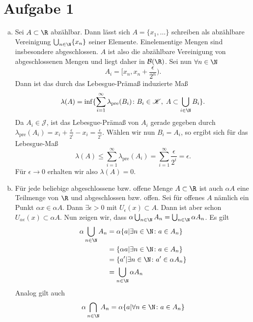 \documentclass{article}
\begin{document}
\def\headheight{25pt}
    \section*{Aufgabe 1}    
    \begin{enumerate}[(a)]
        \item Sei $A \subset \R$ abzählbar. Dann lässt sich $A = \{x_1, \dots \}$ schreiben als abzählbare Vereinigung $\bigcup_{n\in \N} \{x_n\}$ seiner Elemente. Einelementige Mengen sind insbesondere abgeschlossen. $A$ ist also die abzählbare Vereinigung von abgeschlossenen Mengen und liegt daher in $\mathcal{B}(\R)$. Sei nun $\forall n \in \N$
        \[
            A_i = [x_n, x_n + \frac{\epsilon}{2^n}).
        \]
        Dann ist das durch das Lebesgue-Prämaß induzierte Maß
        \[
            \lambda(A) = \inf \{\sum_{i = 1}^{\infty} \lambda_{\text{pre}}(B_i)\colon B_i \in \mathscr{K},\; A \subset \bigcup_{i\in \N} B_i\}.
        \]
        Da $A_i \in \mathscr{J}$, ist das Lebesgue-Prämaß von $A_i$ gerade gegeben durch $\lambda_\text{pre}(A_i) = x_i + \frac{\epsilon}{2^i} - x_i = \frac{\epsilon}{2^i}$. Wählen wir nun $B_i = A_i$, so ergibt sich für das Lebesgue-Maß
        \[
        \lambda(A) \leq \sum_{i = 1}^{\infty} \lambda_\text{pre}(A_i) = \sum_{i = 1}^{\infty} \frac{\epsilon}{2^i} = \epsilon.
        \]
        Für $\epsilon \to 0$ erhalten wir also $\lambda(A) = 0 $.
        \item Für jede beliebige abgeschlossene bzw. offene Menge $A \subset \R$ ist auch $\alpha A$ eine Teilmenge von $\R$ und abgeschlossen bzw. offen. Sei für offenes $A$ nämlich ein Punkt $\alpha x \in \alpha A$. Dann $\exists \epsilon > 0$ mit $U_\epsilon(x) \subset A$. Dann ist aber schon $U_{\alpha \epsilon}(x) \subset \alpha A$. 
        Nun zeigen wir, dass $\alpha \bigcup_{n\in \N} A_n = \bigcup_{n\in \N} \alpha A_n$. Es gilt 
        \begin{align*}
            \alpha \bigcup_{n\in \N} A_n &= \alpha \{a | \exists n\in \N\colon a \in A_n\}\\
            &= \{\alpha a | \exists n\in \N \colon a \in A_n\}\\
            &= \{a' | \exists n \in \N\colon a' \in \alpha A_n\}\\
            &= \bigcup_{n\in \N} \alpha A_n
        \end{align*}
        Analog gilt auch
        \begin{align*}
            \alpha \bigcap_{n\in \N} A_n &= \alpha \{a | \forall n\in \N\colon a \in A_n\}\\

\end{align*}
\end{enumerate}
\end{document}
